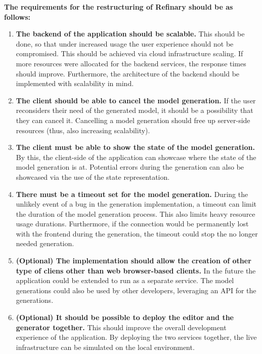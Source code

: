 \textbf{The requirements for the restructuring of Refinary should be as follows:}
\begin{enumerate}
        \item \label{requirementscale} \textbf{The backend of the application should be scalable.} This should be done, so that under increased usage 
		the user experience should not be compromised. This should be achieved via cloud infrastructure scaling.
		If more resources were allocated for the backend services, the response times should improve. Furthermore, the
		architecture of the backend should be implemented with scalability in mind.
        \item \label{requirementcancel} \textbf{The client should be able to cancel the model generation.} If the user reconsiders their need of the 
		generated model, it should be a possibility that they can cancel it. Cancelling a model generation should 
		free up server-side resources (thus, also increasing scalability).
		\item \label{requirementstate} \textbf{The client must be able to show the state of the model generation.} By this, the client-side of the application can showcase
        where the state of the model generation is at. Potential errors during the generation can also be showcased via the use of the state representation.
        \item \label{requirementtimeout} \textbf{There must be a timeout set for the model generation.} During the unlikely event of a bug in the generation implementation, 
		a timeout can limit the duration of the model generation process. This also limits heavy resource usage durations. Furthermore, if the connection would be 
		permanently lost with the frontend during the generation, the timeout could stop the no longer needed generation.
		\item \label{requirementseparateclient} \textbf{(Optional) The implementation should allow the creation of other type of cliens other than web browser-based clients.} In the future
		the application could be extended to run as a separate service. The model generations could also be used by other developers, leveraging an API for the
		generations.
		\item \label{requirementdeployment} \textbf{(Optional) It should be possible to deploy the editor and the generator together.} 
		This should improve the overall development experience of the application.
		By deploying the two services together, the live infrastructure can be simulated on the local environment.
\end{enumerate}

